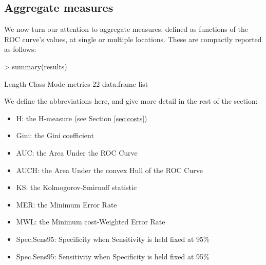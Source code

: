 \documentclass{article}
\begin{document}
\subsection{Aggregate measures}\label{sec:aggregate}
We now turn our attention to aggregate measures, defined as functions of the ROC curve's values, at single or multiple locations. These are compactly reported as follows: 
\begin{Schunk}
\begin{Sinput}
> summary(results)
\end{Sinput}
\begin{Soutput}
        Length Class      Mode
metrics 22     data.frame list
\end{Soutput}
\end{Schunk}
We define the abbreviations here, and give more detail in the rest of the section: 
\begin{itemize}
\item H: the H-measure (see Section \ref{sec:costs})
\item Gini: the Gini coefficient
\item AUC: the Area Under the ROC Curve
\item AUCH: the Area Under the convex Hull of the ROC Curve
\item KS: the Kolmogorov-Smirnoff statistic
\item MER: the Minimum Error Rate
\item MWL: the Minimum cost-Weighted Error Rate
\item Spec.Sens95: Specificity when Sensitivity is held fixed at 95\%
\item Spec.Sens95: Sensitivity when Specificity is held fixed at 95\%
\end{itemize}
\end{document}
